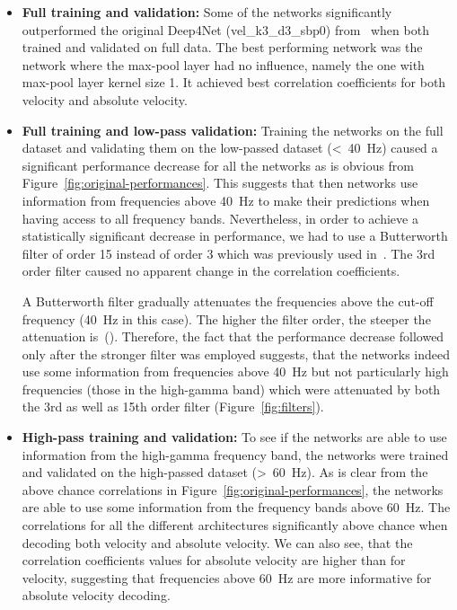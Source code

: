 \begin{itemize}
    \item \textbf{Full training and validation:} Some of the networks significantly outperformed the original Deep4Net (vel\_k3\_d3\_sbp0) from~\cite{Hammer-2021} when both trained and validated on full data.
    The best performing network was the network where the max-pool layer had no influence, namely the one with max-pool layer kernel size 1. It achieved best correlation coefficients for both velocity and absolute velocity.
    
    \item \textbf{Full training and low-pass validation:} Training the networks on the full dataset and validating them on the low-passed dataset (<~40~Hz) caused a significant performance decrease for all the networks as is obvious from Figure~\ref{fig:original-performances}.
    This suggests that then networks use information from frequencies above 40~Hz to make their predictions when having access to all frequency bands.
    Nevertheless, in order to achieve a statistically significant decrease in performance, we had to use a Butterworth filter of order 15 instead of order 3 which was previously used in~\cite{Hammer-2021}. The 3rd order filter caused no apparent change in the correlation coefficients.
    
    A Butterworth filter gradually attenuates the frequencies above the cut-off frequency (40~Hz in this case).
    The higher the filter order, the steeper the attenuation is~(\cite{butterworth1930theory}).
    Therefore, the fact that the performance decrease followed only after the stronger filter was employed suggests, that the networks indeed use some information from frequencies above 40~Hz but not particularly high frequencies (those in the high-gamma band) which were attenuated by both the 3rd as well as 15th order filter (Figure~\ref{fig:filters}).
    
    \item \textbf{High-pass training and validation:} To see if the networks are able to use information from the high-gamma frequency band, the networks were trained and validated on the high-passed dataset (>~60~Hz).
    As is clear from the above chance correlations in Figure~\ref{fig:original-performances}, the networks are able to use some information from the frequency bands above 60~Hz. 
    The correlations for all the different architectures significantly above chance when decoding both velocity and absolute velocity. We can also see, that the correlation coefficients values for absolute velocity are higher than for velocity, suggesting that frequencies above 60~Hz are more informative for absolute velocity decoding.
    

\end{itemize}
